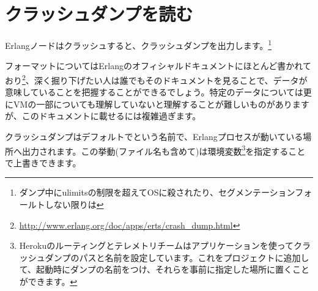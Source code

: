 \chapter{クラッシュダンプを読む}
\label{chap:crash-dumps}

Erlangノードはクラッシュすると、クラッシュダンプを出力します。\footnote{ダンプ中にulimitsの制限を超えてOSに殺されたり、セグメンテーションフォールトしない限りは}

フォーマットについてはErlangのオフィシャルドキュメントにほとんど書かれており\footnote{\href{http://www.erlang.org/doc/apps/erts/crash\_dump.html}{http://www.erlang.org/doc/apps/erts/crash\_dump.html}}、深く掘り下げたい人は誰でもそのドキュメントを見ることで、データが意味していることを把握することができるでしょう。特定のデータについては更にVMの一部についても理解していないと理解することが難しいものがありますが、このドキュメントに載せるには複雑過ぎます。

クラッシュダンプはデフォルトでという名前で、Erlangプロセスが動いている場所へ出力されます。この挙動(ファイル名も含めて)は環境変数\footnote{Herokuのルーティングとテレメトリチームはアプリケーションを使ってクラッシュダンプのパスと名前を設定しています。これをプロジェクトに追加して、起動時にダンプの名前をつけ、それらを事前に指定した場所に置くことができます。}を指定することで上書きできます。

